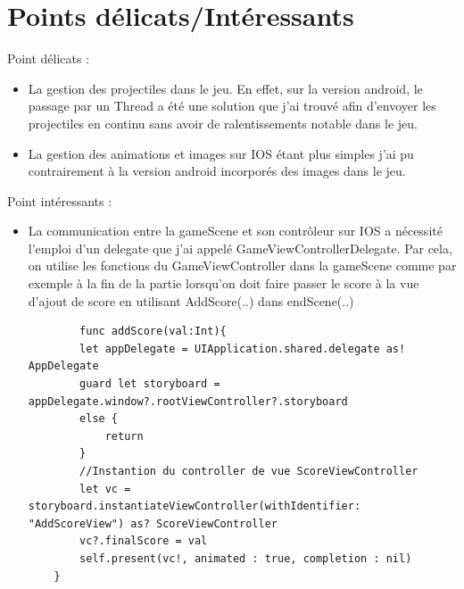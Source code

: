 \documentclass{article}
\begin{document}
\section{Points délicats/Intéressants}
Point délicats : 
\begin{itemize}
    \item 
La gestion des projectiles dans le jeu. En effet, sur la version android, le passage par un Thread a été une solution que j'ai trouvé afin d'envoyer les projectiles en continu sans avoir de ralentissements notable dans le jeu.
    \item 
La gestion des animations et images sur IOS étant plus simples j'ai pu contrairement à la version android incorporés des images dans le jeu. 
\end{itemize}

Point intéressants : 
\begin{itemize}
    \item La communication entre la gameScene et son contrôleur sur IOS a nécessité l'emploi d'un delegate que j'ai appelé GameViewControllerDelegate. Par cela, on utilise les fonctions du GameViewController dans la gameScene comme par exemple à la fin de la partie lorsqu'on doit faire passer le score à la vue d'ajout de score en utilisant AddScore(..) dans endScene(..)
    \begin{verbatim}
        func addScore(val:Int){
        let appDelegate = UIApplication.shared.delegate as! AppDelegate
        guard let storyboard = appDelegate.window?.rootViewController?.storyboard
        else {
            return
        }
        //Instantion du controller de vue ScoreViewController 
        let vc = storyboard.instantiateViewController(withIdentifier: "AddScoreView") as? ScoreViewController
        vc?.finalScore = val
        self.present(vc!, animated : true, completion : nil)
    }
    \end{verbatim}
\end{itemize}
\end{document}
